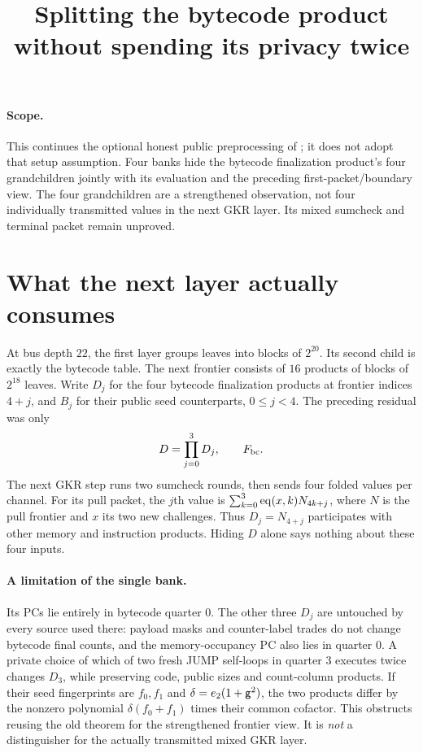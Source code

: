\documentclass[11pt]{article}
\title{Splitting the bytecode product without spending its privacy twice}
\author{}
\date{}
\begin{document}
\maketitle
\vspace{-2em}

\paragraph{Scope.} This continues the optional honest public preprocessing of ; it does not adopt that setup assumption. Four banks hide the bytecode finalization product's four grandchildren jointly with its evaluation and the preceding first-packet/boundary view. The four grandchildren are a strengthened observation, not four individually transmitted values in the next GKR layer. Its mixed sumcheck and terminal packet remain unproved.

\section{What the next layer actually consumes}

At bus depth $22$, the first layer groups leaves into blocks of $2^{20}$. Its second child is exactly the bytecode table. The next frontier consists of $16$ products of blocks of $2^{18}$ leaves. Write $D_j$ for the four bytecode finalization products at frontier indices $4+j$, and $B_j$ for their public seed counterparts, $0\le j<4$. The preceding residual was only
\[
 D=\prod_{j=0}^3D_j,\qquad F_{\rm bc}.
\]
The next GKR step runs two sumcheck rounds, then sends four folded values per channel. For its pull packet, the $j$th value is $\sum_{k=0}^3\operatorname{eq}(x,k)N_{4k+j}$, where $N$ is the pull frontier and $x$ its two new challenges. Thus $D_j=N_{4+j}$ participates with other memory and instruction products. Hiding $D$ alone says nothing about these four inputs.

\paragraph{A limitation of the single bank.} Its PCs lie entirely in bytecode quarter $0$. The other three $D_j$ are untouched by every source used there: payload masks and counter-label trades do not change bytecode final counts, and the memory-occupancy PC also lies in quarter $0$. A private choice of which of two fresh JUMP self-loops in quarter $3$ executes twice changes $D_3$, while preserving code, public sizes and count-column products. If their seed fingerprints are $f_0,f_1$ and $\delta=e_2(1+\mathsf{g}^2)$, the two products differ by the nonzero polynomial $\delta(f_0+f_1)$ times their common cofactor. This obstructs reusing the old theorem for the strengthened frontier view. It is \emph{not} a distinguisher for the actually transmitted mixed GKR layer.
\end{document}
